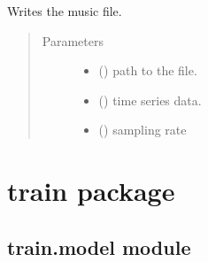 \documentclass[letterpaper,10pt,english]{sphinxmanual}
\begin{document}

\begin{fulllineitems}
\label{\detokenize{docs/source/preprocess:preprocess.utility.write}}
Writes the music file.
\begin{quote}\begin{description}
\item[{Parameters}] \leavevmode\begin{itemize}
\item {} 
 () \textendash{} path to the file.

\item {} 
 (\sphinxstyleliteralemphasis{\sphinxupquote{, }}\sphinxstyleliteralemphasis{\sphinxupquote{(}}\sphinxstyleliteralemphasis{\sphinxupquote{, }}\sphinxstyleliteralemphasis{\sphinxupquote{)}}) \textendash{} time series data.

\item {} 
 () \textendash{} sampling rate

\end{itemize}

\end{description}\end{quote}

\end{fulllineitems}



\chapter{train package}
\label{\detokenize{docs/source/train:train-package}}\label{\detokenize{docs/source/train::doc}}

\section{train.model module}
\label{\detokenize{docs/source/train:module-train.model}}\label{\detokenize{docs/source/train:train-model-module}}
\end{document}
